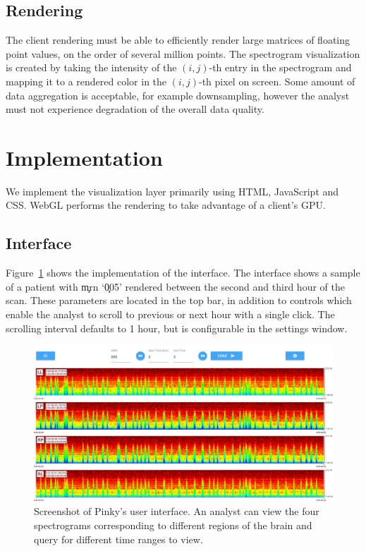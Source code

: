 \subsection{Rendering}

The client rendering must be able to efficiently render large matrices of
floating point values, on the order of several million points. The spectrogram
visualization is created by taking the intensity of the $(i, j)$-th entry in
the spectrogram and mapping it to a rendered color in the $(i, j)$-th pixel on
screen. Some amount of data aggregation is acceptable, for example
downsampling, however the analyst must not experience degradation of the
overall data quality. \\

\section{Implementation}

We implement the visualization layer primarily using HTML, JavaScript and CSS.
WebGL performs the rendering to take advantage of a client's GPU.

\subsection{Interface}

Figure~\ref{fig:whole-interface} shows the implementation of the interface. The
interface shows a sample of a patient with \c{mrn} `\c{005}' rendered between
the second and third hour of the scan. These parameters are located in the top
bar, in addition to controls which enable the analyst to scroll to previous or
next hour with a single click. The scrolling interval defaults to 1 hour, but
is configurable in the settings window. \\

\begin{figure}[h]
\begin{center}
\includegraphics[scale=0.35]{./img/whole-interface.png}
\caption{Screenshot of Pinky's user interface. An analyst can view the four
  spectrograms corresponding to different regions of the brain and query for
  different time ranges to view.}
\label{fig:whole-interface}
\end{center}
\end{figure}

